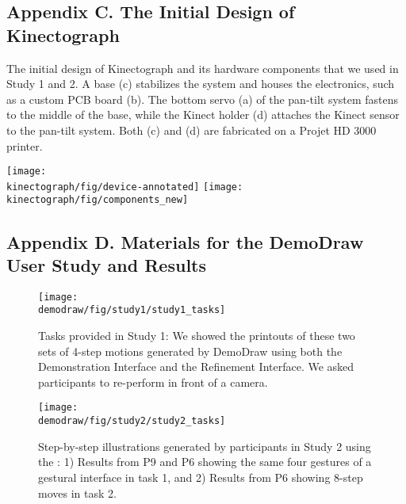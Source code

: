 \begin{appendices}
\clearpage


\subsection{Appendix C. The Initial Design of Kinectograph}
\label{kinectograph_original_design}

The initial design of Kinectograph and its hardware components that we used in Study 1 and 2. A base (c) stabilizes the system and houses the electronics, such as a custom PCB board (b). The bottom servo (a) of the pan-tilt system fastens to the middle of the base, while the Kinect holder (d) attaches the Kinect sensor to the pan-tilt system. Both (c) and (d) are fabricated on a Projet HD 3000 printer.

\centering
\vspace{20pt}
\texttt{[image: \\kinectograph/fig/device-annotated]}
\vspace{20pt}
\texttt{[image: \\kinectograph/fig/components\_new]}

\clearpage


\subsection{Appendix D. Materials for the DemoDraw User Study and Results}
\label{demodraw_study_materials}

\renewcommand\thefigure{D.\arabic{figure}}

\begin{figure}[h!]
     \centering
    \texttt{[image: \\demodraw/fig/study1/study1\_tasks]}
    \caption{Tasks provided in Study 1: We showed the printouts of these two sets of 4-step motions generated by DemoDraw using both the Demonstration Interface and the Refinement Interface. We asked participants to re-perform in front of a camera.}
    \label{fig:study_review_tasks}
 \end{figure}

   \vspace{6mm}
\begin{figure}[h!]
     \centering
    \texttt{[image: \\demodraw/fig/study2/study2\_tasks]}
    \caption{Step-by-step illustrations generated by participants in Study 2 using the \phaseI{}: 1) Results from P9 and P6 showing the same four gestures of a gestural interface in task 1, and 2) Results from P6 showing 8-step moves in task 2.}
    \label{fig:study_authoring_tasks}
   \end{figure}


\end{appendices}
